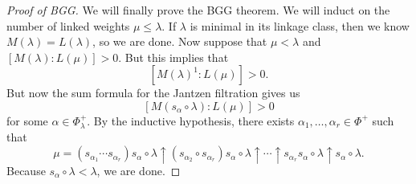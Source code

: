 \documentclass{amsart}
\theoremstyle{definition}
\theoremstyle{remark}
\theoremstyle{plain}
\theoremstyle{definition}
\theoremstyle{remark}
\newcommand{\1}{\mathbf{1}}
\newcommand{\2}{\mathbf{2}}
\newcommand{\3}{\mathbf{3}}
\begin{document}
\begin{proof}[Proof of BGG]
  We will finally prove the BGG theorem. We will induct on the number of linked weights $\mu \leq \lambda$. If $\lambda$ is minimal in its linkage class, then we know $M(\lambda) = L(\lambda)$, so we are done. Now suppose that $\mu < \lambda$ and $[M(\lambda) : L(\mu)] > 0$. But this implies that
  \[ [ M(\lambda)^1 : L(\mu) ] > 0. \]
  But now the sum formula for the Jantzen filtration gives us
  \[ [M(s_{\alpha} \circ \lambda) : L(\mu)] > 0 \]
  for some $\alpha \in \Phi_{\lambda}^+$. By the inductive hypothesis, there exists $\alpha_1, \ldots, \alpha_r \in \Phi^+$ such that
  \[ \mu = (s_{\alpha_1} \cdots s_{\alpha_r}) s_{\alpha} \circ \lambda \uparrow (s_{\alpha_2} \circ s_{\alpha_r}) s_{\alpha} \circ \lambda \uparrow \cdots \uparrow s_{\alpha_r} s_{\alpha} \circ \lambda \uparrow s_{\alpha} \circ \lambda. \]
  Because $s_{\alpha} \circ \lambda < \lambda$, we are done.
\end{proof}
\end{document}
